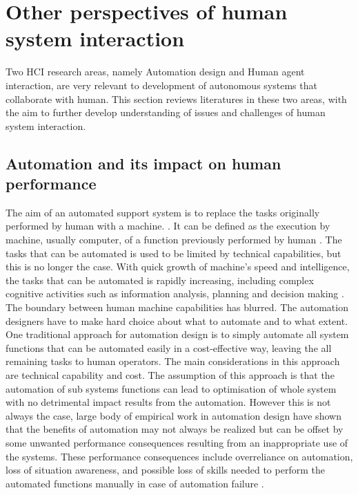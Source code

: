 


\section{Other perspectives of human system interaction}
Two \ac{HCI} research areas, namely Automation design and Human agent interaction, are very relevant to development of autonomous systems that collaborate with human. This section reviews literatures in these two areas, with the aim to further develop understanding of issues and challenges of human system interaction. \\


\subsection{Automation and its impact on human performance}
The aim of an automated support system is to replace the tasks originally performed by human with a machine. \cite{Bradshaw2011} . It can be defined as the execution by machine, usually computer, of a function previously performed by human \cite{Parasuraman1997}. The tasks that can be automated is used to be limited by technical capabilities, but this is no longer the case. With quick growth of machine's speed and intelligence, the tasks that can be automated is rapidly increasing, including complex cognitive activities such as information analysis, planning and decision making \cite{Parasuraman2000}. The boundary between human machine capabilities has blurred. The automation designers have to make hard choice about what to automate and to what extent.\\

One traditional approach for automation design is to simply automate all system functions that can be automated easily in a cost-effective way, leaving the all remaining tasks to human operators. The main considerations in this approach are technical capability and cost. The assumption of this approach is that the automation of sub systems functions can lead to optimisation of whole system with no detrimental impact results from the automation. However this is not always the case, large body of empirical work in automation design \cite{Manzey2012,Parasuraman2000} have shown that the benefits of automation may not always be realized but can be offset by some unwanted performance consequences resulting from an inappropriate use of the systems. These performance consequences include overreliance on automation, loss of situation awareness, and possible loss of skills needed to perform the automated functions manually in case of automation failure \cite{Kaber1997}.\\ 

